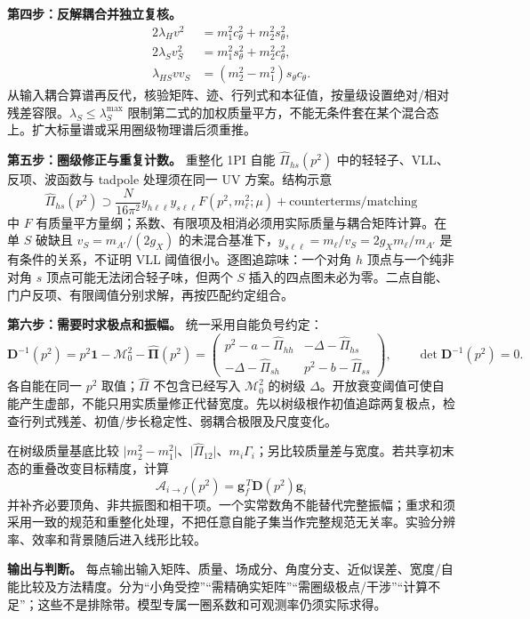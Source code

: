 \documentclass[
]{article}
\begin{document}
\textbf{第四步：反解耦合并独立复核。} \[
\begin{aligned}
2\lambda_Hv^2&=m_1^2c_\theta^2+m_2^2s_\theta^2,\\
2\lambda_Sv_S^2&=m_1^2s_\theta^2+m_2^2c_\theta^2,\\
\lambda_{HS}vv_S&=(m_2^2-m_1^2)s_\theta c_\theta.
\end{aligned}
\]
从输入耦合算谱再反代，核验矩阵、迹、行列式和本征值，按量级设置绝对/相对残差容限。\(\lambda_S\le\lambda_S^{\max}\)
限制第二式的加权质量平方，不能无条件套在某个混合态上。扩大标量谱或采用圈级物理谱后须重推。

\textbf{第五步：圈级修正与重复计数。} 重整化 1PI 自能
\(\widehat\Pi_{hs}(p^2)\) 中的轻轻子、VLL、反项、波函数与 tadpole
处理须在同一 UV 方案。结构示意 \[
\widehat\Pi_{hs}(p^2)\supset
\frac{N}{16\pi^2}y_{h\ell\ell}y_{s\ell\ell}F(p^2,m_\ell^2;\mu)
+\text{counterterms/matching}
\] 中 \(F\)
有质量平方量纲；系数、有限项及相消必须用实际质量与耦合矩阵计算。在单
\(S\) 破缺且 \(v_S=m_{A'}/(2g_X)\)
的未混合基准下，\(y_{s\ell\ell}=m_\ell/v_S=2g_Xm_\ell/m_{A'}\)
是有条件的关系，不证明 VLL 阈值很小。逐图追踪味：一个对角 \(h\)
顶点与一个纯非对角 \(s\) 顶点可能无法闭合轻子味，但两个 \(S\)
插入的四点图未必为零。二点自能、门户反项、有限阈值分别求解，再按匹配约定组合。

\textbf{第六步：需要时求极点和振幅。} 统一采用自能负号约定： \[
\mathbf D^{-1}(p^2)=p^2\mathbf1-\mathcal M_0^2-\widehat{\mathbf\Pi}(p^2)
=\begin{pmatrix}
p^2-a-\widehat\Pi_{hh}&-\Delta-\widehat\Pi_{hs}\\
-\Delta-\widehat\Pi_{sh}&p^2-b-\widehat\Pi_{ss}
\end{pmatrix},\qquad\det\mathbf D^{-1}(p^2)=0.
\] 各自能在同一 \(p^2\) 取值；\(\widehat\Pi\) 不包含已经写入
\(\mathcal M_0^2\) 的树级
\(\Delta\)。开放衰变阈值可使自能产生虚部，不能只用实质量修正代替宽度。先以树级根作初值追踪两复极点，检查行列式残差、初值/步长稳定性、弱耦合极限及尺度变化。

在树级质量基底比较
\(\lvert m_2^2-m_1^2\rvert\)、\(\lvert\widehat\Pi_{12}\rvert\)、\(m_i\Gamma_i\)；另比较质量差与宽度。若共享初末态的重叠改变目标精度，计算
\[
\mathcal A_{i\to f}(p^2)=\mathbf g_f^{\,T}\mathbf D(p^2)\mathbf g_i
\]
并补齐必要顶角、非共振图和相干项。一个实常数角不能替代完整振幅；重求和须采用一致的规范和重整化处理，不把任意自能子集当作完整规范无关率。实验分辨率、效率和背景随后进入线形比较。

\textbf{输出与判断。}
每点输出输入矩阵、质量、场成分、角度分支、近似误差、宽度/自能比较及方法精度。分为``小角受控''``需精确实矩阵''``需圈级极点/干涉''``计算不足''；这些不是排除带。模型专属一圈系数和可观测率仍须实际求得。
\end{document}
